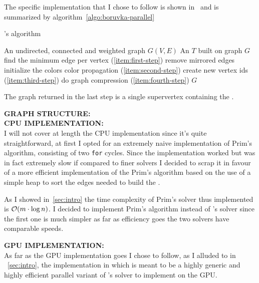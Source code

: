 \documentclass[a4paper,10pt]{article}
\begin{document}
The specific implementation that I chose to follow is shown in~\cite{generic-he-boruvka} and is summarized by algorithm~\ref{algo:boruvka-parallel}

\begin{algorithm}
	\caption{\brka's algorithm}
	\label{algo:boruvka-parallel}
	\begin{algorithmic}[1]
		\REQUIRE An undirected, connected and weighted graph $G(V, E)$
		\ENSURE An \mst$T$ built on graph $G$
			\STATE find the minimum edge per vertex (\ref{item:first-step})
			\STATE remove mirrored edges
			\STATE initialize the colors
				\STATE color propagation (\ref{item:second-step})
			\ENDWHILE
			\STATE create new vertex ids (\ref{item:third-step})
			\STATE do graph compression (\ref{item:fourth-step})
		\ENDWHILE
		\STATE\RETURN $G$
	\end{algorithmic}
\end{algorithm}

The graph returned in the last step is a single supervertex containing the \mst.

\bigskip
{}
\makeatletter{}\makeatother
\label{sec:graph-structure}
\noindent
\textbf{GRAPH STRUCTURE:}
\\

\bigskip
{}
\makeatletter\def\@currentlabel{\texttt{(III)}}\makeatother
\label{sec:cpu-implementation}
\noindent
\textbf{CPU IMPLEMENTATION:}
\\
I will not cover at length the CPU implementation since it's quite straightforward, at first I opted
for an extremely naive implementation of Prim's algorithm, consisting of two \texttt{for} cycles.
Since the implementation worked but was in fact extremely slow if compared to finer solvers I
decided to scrap it in favour of a more efficient implementation of the Prim's algorithm based on
the use of a simple heap to sort the edges needed to build the \mst.

As I showed in~\ref{sec:intro} the time complexity of Prim's solver thus implemented is $\mathcal{O}(m \cdot
\log{n})$. I decided to implement Prim's algorithm instead of \brka's solver since the first one is
much simpler as far as efficiency goes the two solvers have comparable speeds.

\bigskip
{}
\makeatletter\def\@currentlabel{\texttt{(IV)}}\makeatother
\label{sec:gpu-implementation}
\noindent
\textbf{GPU IMPLEMENTATION:}
\\
As far as the GPU implementation goes I chose to follow, as I alluded to in ~\ref{sec:intro}, the
implementation in \cite{generic-he-boruvka} which is meant to be a highly generic and highly
efficient parallel variant of \brka's solver to implement on the GPU.
\end{document}
